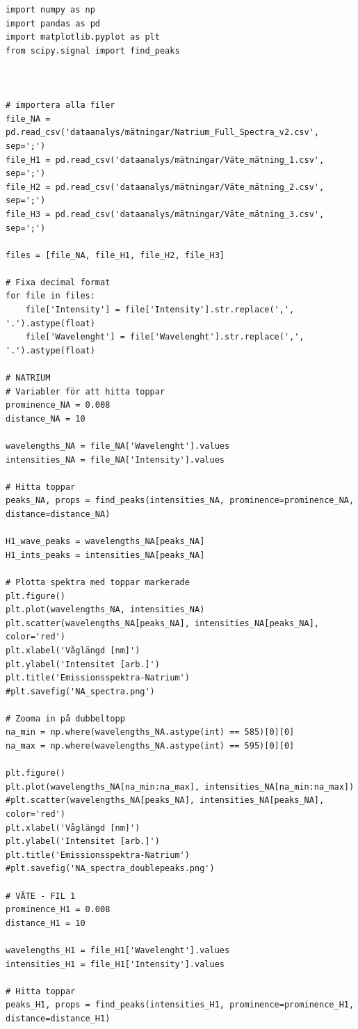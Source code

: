\documentclass[12pt, a4paper]{article}
\begin{document}
\begin{lstlisting}[style=mypython]
import numpy as np
import pandas as pd
import matplotlib.pyplot as plt
from scipy.signal import find_peaks



# importera alla filer
file_NA = pd.read_csv('dataanalys/mätningar/Natrium_Full_Spectra_v2.csv', sep=';')
file_H1 = pd.read_csv('dataanalys/mätningar/Väte_mätning_1.csv', sep=';')
file_H2 = pd.read_csv('dataanalys/mätningar/Väte_mätning_2.csv', sep=';')
file_H3 = pd.read_csv('dataanalys/mätningar/Väte_mätning_3.csv', sep=';')

files = [file_NA, file_H1, file_H2, file_H3]

# Fixa decimal format
for file in files:
    file['Intensity'] = file['Intensity'].str.replace(',', '.').astype(float)
    file['Wavelenght'] = file['Wavelenght'].str.replace(',', '.').astype(float)

# NATRIUM
# Variabler för att hitta toppar
prominence_NA = 0.008
distance_NA = 10

wavelengths_NA = file_NA['Wavelenght'].values
intensities_NA = file_NA['Intensity'].values

# Hitta toppar
peaks_NA, props = find_peaks(intensities_NA, prominence=prominence_NA, distance=distance_NA)

H1_wave_peaks = wavelengths_NA[peaks_NA]
H1_ints_peaks = intensities_NA[peaks_NA]

# Plotta spektra med toppar markerade
plt.figure()
plt.plot(wavelengths_NA, intensities_NA)
plt.scatter(wavelengths_NA[peaks_NA], intensities_NA[peaks_NA], color='red')
plt.xlabel('Våglängd [nm]')
plt.ylabel('Intensitet [arb.]')
plt.title('Emissionsspektra-Natrium')
#plt.savefig('NA_spectra.png')

# Zooma in på dubbeltopp
na_min = np.where(wavelengths_NA.astype(int) == 585)[0][0]
na_max = np.where(wavelengths_NA.astype(int) == 595)[0][0]

plt.figure()
plt.plot(wavelengths_NA[na_min:na_max], intensities_NA[na_min:na_max])
#plt.scatter(wavelengths_NA[peaks_NA], intensities_NA[peaks_NA], color='red')
plt.xlabel('Våglängd [nm]')
plt.ylabel('Intensitet [arb.]')
plt.title('Emissionsspektra-Natrium')
#plt.savefig('NA_spectra_doublepeaks.png')

# VÄTE - FIL 1
prominence_H1 = 0.008
distance_H1 = 10

wavelengths_H1 = file_H1['Wavelenght'].values
intensities_H1 = file_H1['Intensity'].values

# Hitta toppar
peaks_H1, props = find_peaks(intensities_H1, prominence=prominence_H1, distance=distance_H1)


\end{lstlisting}
\end{document}
